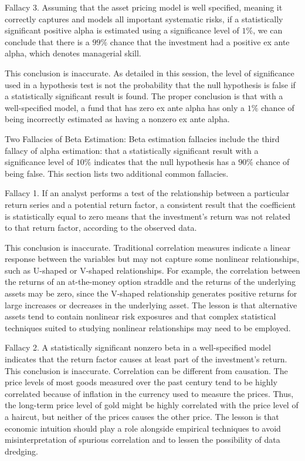 \documentclass[11pt]{article}
\begin{document}
Fallacy 3. Assuming that the asset pricing model is well specified, meaning it correctly captures and models all important systematic risks, if a statistically significant positive alpha is estimated using a significance level of $1 \%$, we can conclude that there is a $99 \%$ chance that the investment had a positive ex ante alpha, which denotes managerial skill.

This conclusion is inaccurate. As detailed in this session, the level of significance used in a hypothesis test is not the probability that the null hypothesis is false if a statistically significant result is found. The proper conclusion is that with a well-specified model, a fund that has zero ex ante alpha has only a $1 \%$ chance of being incorrectly estimated as having a nonzero ex ante alpha.

Two Fallacies of Beta Estimation: Beta estimation fallacies include the third fallacy of alpha estimation: that a statistically significant result with a significance level of $10 \%$ indicates that the null hypothesis has a $90 \%$ chance of being false. This section lists two additional common fallacies.

Fallacy 1. If an analyst performs a test of the relationship between a particular return series and a potential return factor, a consistent result that the coefficient is statistically equal to zero means that the investment's return was not related to that return factor, according to the observed data.

This conclusion is inaccurate. Traditional correlation measures indicate a linear response between the variables but may not capture some nonlinear relationships, such as U-shaped or V-shaped relationships. For example, the correlation between the returns of an at-the-money option straddle and the returns of the underlying assets may be zero, since the $\mathrm{V}$-shaped relationship generates positive returns for large increases or decreases in the underlying asset. The lesson is that alternative assets tend to contain nonlinear risk exposures and that complex statistical techniques suited to studying nonlinear relationships may need to be employed.

Fallacy 2. A statistically significant nonzero beta in a well-specified model indicates that the return factor causes at least part of the investment's return. This conclusion is inaccurate. Correlation can be different from causation. The price levels of most goods measured over the past century tend to be highly correlated because of inflation in the currency used to measure the prices. Thus, the long-term price level of gold might be highly correlated with the price level of a haircut, but neither of the prices causes the other price. The lesson is that economic intuition should play a role alongside empirical techniques to avoid misinterpretation of spurious correlation and to lessen the possibility of data dredging.
\end{document}
